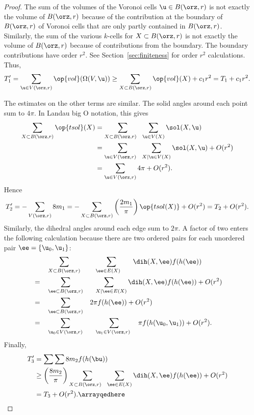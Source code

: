 \begin{proof}
The sum of the volumes of the Voronoi cells $ \u\in B(\orz,r)$ is not
exactly the volume of $B(\orz,r)$ because of the contribution at the
boundary of $B(\orz,r)$ of Voronoi cells that are only partly contained
in $B(\orz,r)$.  Similarly, the sum of the various $k$-cells for
$X\subset B(\orz,r)$ is not exactly the volume of $B(\orz,r)$ because of
contributions from the boundary. The boundary contributions have order
$r^2$.  See Section~\ref{sec:finiteness} for order $r^2$ calculations. 
Thus,
\[  
T_1'= \sum_{ \u\in  V(\orz,r)} \op{vol}(\Omega(V, \u)) 
\ge \sum_{X\subset B(\orz,r)} \op{vol}(X) + c_1 r^2 = T_1 + c_1 r^2.
\] 


The estimates on the other terms are similar.  The solid angles
around each point sum to $4\pi$.
In Landau big O notation, this gives
\begin{align*} 
\sum_{X\subset B(\orz,r)} \op{tsol}(X) &= 
\sum_{X\subset B(\orz,r)~~} \sum_{ \u\in V( X)} \sol(X, \u)\\
&=\sum_{ \u\in  V(\orz,r)~~} \sum_{X\mid  \u\in V( X)} \sol(X, \u) + O(r^2)\\
&=\sum_{ \u\in  V(\orz,r)} 4\pi    + O(r^2).
\end{align*}
%
Hence
\[  
T_2' = -\sum_{ V(\orz,r)} 8 m_1 = 
-\sum_{X\subset B(\orz,r)}\left(\frac{2m_1}\pi\right) 
\op{tsol(X)} + O(r^2) = T_2 + O(r^2).
\] 
Similarly, the dihedral angles around each edge sum to $2\pi$.  A
factor of two enters the following calculation because there are two
ordered pairs for each unordered pair $\ee=\{ \u_0, \u_1\}$:
\begin{alignat*}{6}
&\phantom{=}&&\sum_{X\subset B(\orz,r)} 
&&\sum_{~~\ee\in E(X)~~~~~} \dih(X,\ee)  f(h(\ee)) \vspace{3pt}\\
&=&&\sum_{\ee\subset B(\orz,r)} 
&&\sum_{~~X\mid \ee\in E(X)} \dih(X,\ee)  f(h(\ee)) +O(r^2)\vspace{3pt}\\
&=&&\sum_{\ee\subset B(\orz,r)} &&2\pi f(h(\ee)) + O(r^2)\vspace{3pt} \\
&=&&\sum_{ \u_0\in  V(\orz,r)} 
&&\sum_{~~\u_1\in  V(\orz,r)~~~} \pi f(h( \u_0, \u_1)) + O(r^2).\\
\end{alignat*}
Finally,
\arrayqed
\begin{align*} 
T_3' &= \sum\sum 8 m_2 f(h(\bu)) \\
&\ge \left(\frac{8m_2}\pi\right)
\sum_{X\subset B(\orz,r)~~}\sum_{\ee\in E(X)}\dih(X,\ee) f(h(\ee)) + O(r^2) \\
&= T_3 + O(r^2).\arrayqedhere
\end{align*}
\end{proof}




